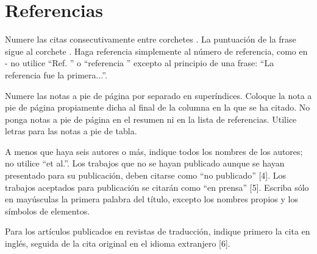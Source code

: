 \section*{Referencias}

Numere las citas consecutivamente entre corchetes \cite{young1989}. La puntuación de la frase sigue al corchete \cite{clerk1892}. Haga referencia simplemente al número de referencia, como en \cite{jacobs1963}- no utilice ``Ref. \cite{jacobs1963}'' o ``referencia \cite{jacobs1963}'' excepto al principio de una frase: ``La referencia \cite{jacobs1963} fue la primera...''. \par

Numere las notas a pie de página por separado en superíndices. Coloque la nota a pie de página propiamente dicha al final de la columna en la que se ha citado. No ponga notas a pie de página en el resumen ni en la lista de referencias. Utilice letras para las notas a pie de tabla. \par

A menos que haya seis autores o más, indique todos los nombres de los autores; no utilice ``et al.''. Los trabajos que no se hayan publicado aunque se hayan presentado para su publicación, deben citarse como ``no publicado'' [4]. Los trabajos aceptados para publicación se citarán como ``en prensa'' [5]. Escriba sólo en mayúsculas la primera palabra del título, excepto los nombres propios y los símbolos de elementos. \par

Para los artículos publicados en revistas de traducción, indique primero la cita en inglés, seguida de la cita original en el idioma extranjero [6].